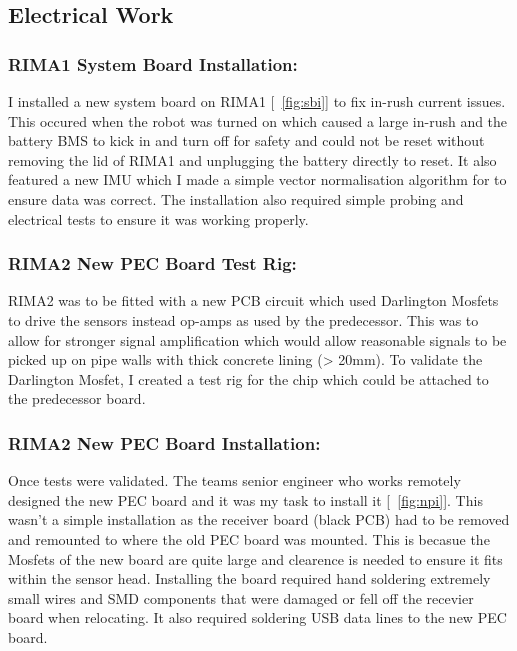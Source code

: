 \subsection{Electrical Work}

\subsubsection{RIMA1 System Board Installation:}
I installed a new system board on RIMA1 [~\ref{fig:sbi}] to fix in-rush current issues. This occured when the robot was turned on which caused a large in-rush and the battery BMS to kick in and turn off for safety and could not be reset without removing the lid of RIMA1 and 
unplugging the battery directly to reset. It also featured a new IMU which I made a simple vector normalisation algorithm for to ensure data was correct. The installation also required simple probing and electrical tests
to ensure it was working properly. 


\subsubsection{RIMA2 New PEC Board Test Rig:}
RIMA2 was to be fitted with a new PCB circuit which used Darlington Mosfets to drive the sensors instead op-amps as used by the predecessor. This was to allow for stronger signal amplification which would allow reasonable signals to 
be picked up on pipe walls with thick concrete lining (> 20mm). To validate the Darlington Mosfet, I created a test rig for the chip which could be attached to the predecessor board.



\newpage
\subsubsection{RIMA2 New PEC Board Installation:}
Once tests were validated. The teams senior engineer who works remotely designed the new PEC board and it was my task to install it [~\ref{fig:npi}]. This wasn't a simple installation as the receiver board (black PCB) had to be removed and remounted to 
where the old PEC board was mounted. This is becasue the Mosfets of the new board are quite large and clearence is needed to ensure it fits within the sensor head. Installing the board required 
hand soldering extremely small wires and SMD components that were damaged or fell off the recevier board when relocating. It also required soldering USB data lines to the new PEC board.

